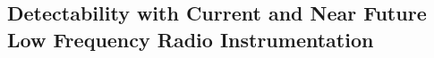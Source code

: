 \documentclass[iop,numberedappendix,apj]{emulateapj}
\def\memoYF#1{\color{red}$[${\bf #1}$]$ \color{black}}
\begin{document}

\subsection{Detectability with Current and Near Future Low Frequency Radio Instrumentation}
\label{ss:detectability}
\end{document}
